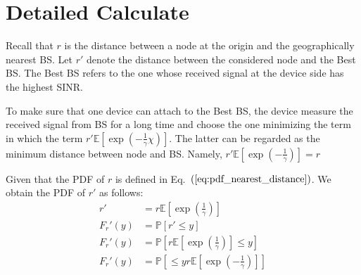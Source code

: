 \section{Detailed Calculate}
Recall that $r$ is the distance between a node at the origin and the geographically nearest BS. Let $r'$ denote the distance between the considered node and the Best BS. The Best BS refers to the one whose received signal at the device side has the highest SINR.

To make sure that one device can attach to the Best BS, the device measure the received signal from BS for a long time and choose the one minimizing the term in which the term $r' \mathbb{E}\left[ \exp\left( -\frac{1}{\gamma}\chi\right) \right]$. The latter can be regarded as the minimum distance between node and BS. Namely, $r' \mathbb{E}\left[ \exp\left( -\frac{1}{\gamma}\right) \right] =  r $

Given that the PDF of $r$ is defined in Eq.~$\left( \ref{eq:pdf_nearest_distance}\right)$. We obtain the PDF of $r'$ as follows:
\begin{align}
	r' &=  r \mathbb{E}\left[ \exp\left( \frac{1}{\gamma}\right) \right] \\
	F_r'(y) &= \mathbb{P}\left[ r' \leq y \right]  \\
	F_r'(y) &= \mathbb{P}\left[ r \mathbb{E}\left[ \exp\left( \frac{1}{\gamma}\right) \right]  \leq y \right]  \\
	F_r'(y) &= \mathbb{P}\left[ \leq y r \mathbb{E}\left[ \exp\left( -\frac{1}{\gamma}\right) \right]  \right]  \\
\end{align}